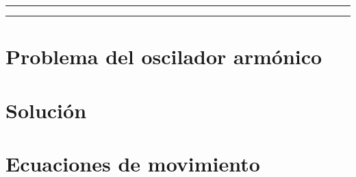 \documentclass[12pt]{article}
\begin{document}


\tableofcontents			%

\begin{center}
	\rule[0mm]{150mm}{0.1mm}		%
	\end{center}
	
	
\begin{abstract}		%
  
\end{abstract}
	
\begin{center}
	\rule[0mm]{150mm}{0.1mm}
	\end{center}

\section{Problema del oscilador armónico}	
            
                            
\section{Solución}
    

\section{Ecuaciones de movimiento}
    
\end{document}
